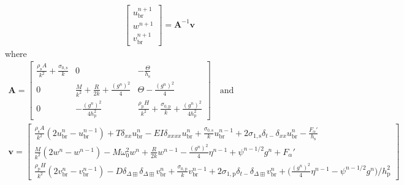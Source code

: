 \documentclass{article}
\begin{document}
\begin{align}
\begin{bmatrix}
        u^{n+1}_\text{br}\\
        w^{n+1}\\
        v^{n+1}_\text{br}
    \end{bmatrix}
    = 
    \mathbf{A}^{-1}\mathbf{v}
\end{align}
where
\begin{equation}
\begin{gathered}
\mathbf{A} = 
    \begin{bmatrix}
        \frac{\rho_\text{s} A}{k^2} + \frac{\sigma_{0,\text{s}}}{k} & 0 & - \frac{\Theta}{h_\text{s}}\\
        0 & \frac{M}{k^2}+\frac{R}{2k}+\frac{(g^n)^2}{4} &\Theta-\frac{(g^n)^2}{4}\\
        0 & -\frac{(g^n)^2}{4h_\text{p}^2} & \frac{\rho_\text{p}H}{k^2} + \frac{\sigma_{0,\text{p}}}{k} + \frac{(g^n)^2}{4h_\text{p}^2}
    \end{bmatrix}
    \quad \text{and}\\
    \mathbf{v} = 
    \begin{bmatrix}
        \frac{\rho_\text{s} A}{k^2}(2u^n_\text{br}-u_\text{br}^{n-1})+T\delta_{xx}u_\text{br}^n-EI\delta_{xxxx}u_\text{br}^n + \frac{\sigma_{0,\text{s}}}{k}u_\text{br}^{n-1} + 2\sigma_{1,\text{s}}\delta_{t-}\delta_{xx}u_\text{br}^n - \frac{F_\alpha'}{h_\text{s}}\\
        \frac{M}{k^2}(2w^n-w^{n-1})-M\omega_0^2w^n + \frac{R}{2k}w^{n-1}-\frac{(g^n)^2}{4}\eta^{n-1}+\psi^{n-1/2}g^n + F_\alpha'\\
        \frac{\rho_\text{p}H}{k^2}(2v_\text{br}^n-v_\text{br}^{n-1})-D\delta_{\Delta\boxplus}\delta_{\Delta\boxplus}v_\text{br}^n+ \frac{\sigma_{0,\text{p}}}{k}v^{n-1}_\text{br} + 2\sigma_{1,\text{p}}\delta_{t-}\delta_{\Delta\boxplus}v^n_\text{br} + \Big(\frac{(g^n)^2}{4}\eta^{n-1}-\psi^{n-1/2}g^n\Big)/h_\text{p}^2
    \end{bmatrix}
    \nonumber
\end{gathered}
\end{equation}
\end{document}
